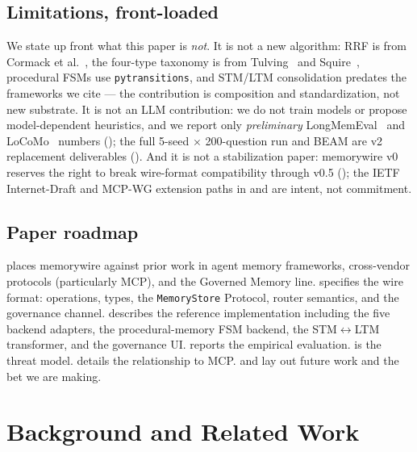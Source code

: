 \documentclass[11pt,letterpaper,twocolumn]{article}
\begin{document}
\subsection{Limitations, front-loaded}
\label{sec:intro-limitations}

We state up front what this paper is \emph{not}. It is not a new algorithm: RRF is from Cormack et al.~\cite{cormack2009rrf}, the four-type taxonomy is from Tulving~\cite{tulving1972episodic} and Squire~\cite{squire1992declarative}, procedural FSMs use \texttt{pytransitions}, and STM/LTM consolidation predates the frameworks we cite --- the contribution is composition and standardization, not new substrate. It is not an LLM contribution: we do not train models or propose model-dependent heuristics, and we report only \emph{preliminary} LongMemEval~\cite{wu2024longmemeval} and LoCoMo~\cite{maharana2024locomo} numbers (); the full 5-seed $\times$ 200-question run and BEAM are v2 replacement deliverables (). And it is not a stabilization paper: memorywire v0 reserves the right to break wire-format compatibility through v0.5 (); the IETF Internet-Draft and MCP-WG extension paths in  and  are intent, not commitment.

\subsection{Paper roadmap}
\label{sec:intro-roadmap}

 places memorywire against prior work in agent memory frameworks, cross-vendor protocols (particularly MCP), and the Governed Memory line.  specifies the wire format: operations, types, the \texttt{MemoryStore} Protocol, router semantics, and the governance channel.  describes the reference implementation including the five backend adapters, the procedural-memory FSM backend, the STM$\leftrightarrow$LTM transformer, and the governance UI.  reports the empirical evaluation.  is the threat model.  details the relationship to MCP.  and  lay out future work and the bet we are making.

\section{Background and Related Work}
\label{sec:related}
\end{document}
